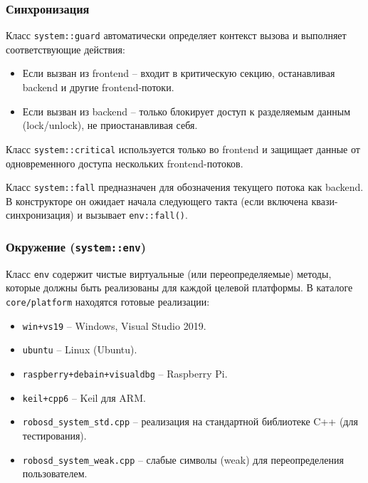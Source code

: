 \documentclass[a4paper,12pt]{article}
\begin{document}
\subsubsection{Синхронизация}

Класс \texttt{system::guard} автоматически определяет контекст вызова и выполняет соответствующие действия:
\begin{itemize}
    \item Если вызван из frontend -- входит в критическую секцию, останавливая backend и другие frontend-потоки.
    \item Если вызван из backend -- только блокирует доступ к разделяемым данным (lock/unlock), не приостанавливая себя.
\end{itemize}

Класс \texttt{system::critical} используется только во frontend и защищает данные от одновременного доступа нескольких frontend-потоков.

Класс \texttt{system::fall} предназначен для обозначения текущего потока как backend. В конструкторе он ожидает начала следующего такта (если включена квази-синхронизация) и вызывает \texttt{env::fall()}.

\subsubsection{Окружение (\texttt{system::env})}

Класс \texttt{env} содержит чистые виртуальные (или переопределяемые) методы, которые должны быть реализованы для каждой целевой платформы. В каталоге \texttt{core/platform} находятся готовые реализации:
\begin{itemize}
    \item \texttt{win+vs19} -- Windows, Visual Studio 2019.
    \item \texttt{ubuntu} -- Linux (Ubuntu).
    \item \texttt{raspberry+debain+visualdbg} -- Raspberry Pi.
    \item \texttt{keil+cpp6} -- Keil для ARM.
    \item \texttt{robosd\_system\_std.cpp} -- реализация на стандартной библиотеке C++ (для тестирования).
    \item \texttt{robosd\_system\_weak.cpp} -- слабые символы (weak) для переопределения пользователем.
\end{itemize}
\end{document}
